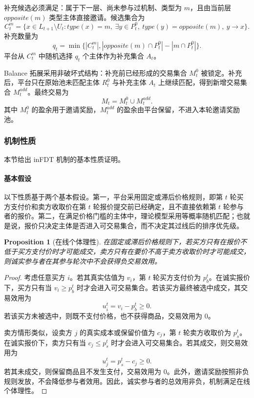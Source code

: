 \documentclass[UTF8,a4paper,12pt]{ctexart}
\newtheorem{proposition}{Proposition}
\begin{document}
补充候选必须满足：属于下一层、尚未参与过机制、类型为 \(m\)，且由当前层 \(opposite(m)\) 类型主体直接邀请。候选集合为
\[
    C_t^m=
    \{x\in L_{t+1}\setminus U_t:
    type(x)=m,\
    \exists y\in P_t^0,\ type(y)=opposite(m),\ y\to x
    \}.
\]
补充数量为
\[
    q_t=
    \min\{
    |C_t^m|,
    |opposite(m)\cap P_t^0|-|m\cap P_t^0|
    \}.
\]
平台从 \(C_t^m\) 中随机选择 \(q_t\) 个主体作为补充集合 \(A_t\)。

Balance 拓展采用非破坏式结构：补充前已经形成的交易集合 \(M_t^0\) 被锁定。补充后，平台只在原始池未匹配主体 \(R_t^0\) 与补充主体 \(A_t\) 上继续匹配，得到新增交易集合 \(M_t^{add}\)。最终交易为
\[
    M_t=M_t^0\cup M_t^{add}.
\]
其中 \(M_t^0\) 的盈余用于邀请奖励，\(M_t^{add}\) 的盈余由平台保留，不进入本轮邀请奖励池。

\subsubsection{机制性质}

本节给出 inFDT 机制的基本性质证明。

\paragraph{基本假设}
以下性质基于两个基本假设。第一，平台采用固定或滞后价格规则，即第 \(t\) 轮买方支付价和卖方收取价在第 \(t\) 轮报价提交前已经确定，且不直接依赖第 \(t\) 轮参与者的报价。第二，在满足价格门槛的主体中，理论模型采用等概率随机匹配；也就是说，报价只决定主体是否进入可交易集合，而不决定其过线后的排序优先级。

\begin{proposition}[在线个体理性]
    在固定或滞后价格规则下，若买方只有在报价不低于买方支付价时才可能成交，卖方只有在要价不高于卖方收取价时才可能成交，则诚实参与者在其参与轮次中不会获得负交易效用。
\end{proposition}

\begin{proof}
    考虑任意买方 \(i\)。若其真实估值为 \(v_i\)，第 \(t\) 轮买方支付价为 \(p_b^t\)。在诚实报价下，买方只有当 \(v_i\ge p_b^t\) 时才会进入可交易集合。若该买方最终被选中成交，其交易效用为
    \[
        u_i^t=v_i-p_b^t\ge 0.
    \]
    若该买方未被选中，则既不支付价格，也不获得商品，交易效用为 \(0\)。

    卖方情形类似，设卖方 \(j\) 的真实成本或保留价值为 \(c_j\)，第 \(t\) 轮卖方收取价为 \(p_s^t\)。在诚实报价下，卖方只有当 \(c_j\le p_s^t\) 时才会进入可交易集合。若其成交，则交易效用为
    \[
        u_j^t=p_s^t-c_j\ge 0.
    \]
    若其未成交，则保留商品且不发生支付，交易效用为 \(0\)。此外，邀请奖励按照非负规则发放，不会降低参与者效用。因此，诚实参与者的总效用非负，机制满足在线个体理性。
\end{proof}
\end{document}
